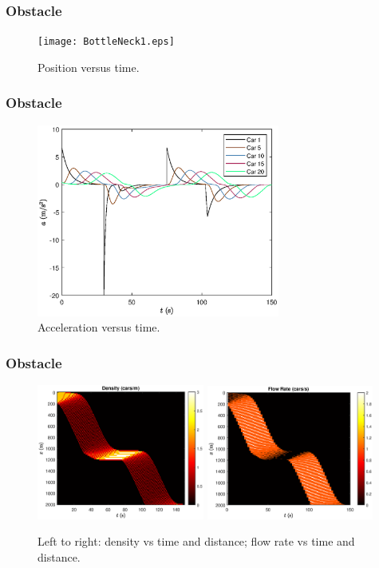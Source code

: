 \documentclass{beamer}
\begin{document}
\begin{frame}
  \frametitle{Obstacle}
  \begin{figure}[H]
    \texttt{[image: BottleNeck1.eps]}
    \caption{Position versus time.} 
\end{figure}
\end{frame}

\begin{frame}
  \frametitle{Obstacle}
  \begin{figure}[H]
    \includegraphics[width=8cm]{BottleNeck3.eps}
    \caption{Acceleration versus time.} 
\end{figure}
\end{frame}

\begin{frame}
  \frametitle{Obstacle}
  \begin{figure}[H]
    \includegraphics[width=5.5cm]{BottleNeck5.eps}
    \includegraphics[width=5.5cm]{BottleNeck6.eps}
    \caption{Left to right: density vs time and distance; flow rate vs time and distance.}
\end{figure}
\end{frame}
\end{document}
